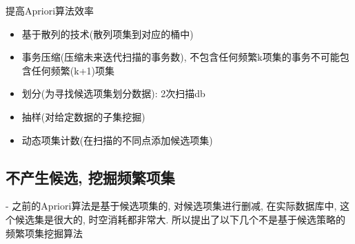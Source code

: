 \documentclass[a4paper,10pt,english]{article}
\begin{document}
提高Apriori算法效率
\begin{itemize}
\item {} 
基于散列的技术(散列项集到对应的桶中)
\item {} 
事务压缩(压缩未来迭代扫描的事务数), 不包含任何频繁k项集的事务不可能包含任何频繁(k+1)项集
\item {} 
划分(为寻找候选项集划分数据): 2次扫描db
\item {} 
抽样(对给定数据的子集挖掘)
\item {} 
动态项集计数(在扫描的不同点添加候选项集)
\end{itemize}

\subsection{不产生候选, 挖掘频繁项集}
\begin{description}
\item {-}
\small{
之前的Apriori算法是基于候选项集的, 对候选项集进行删减, 在实际数据库中, 这个候选集是很大的, 时空消耗都非常大. 所以提出了以下几个不是基于候选策略的频繁项集挖掘算法}
\end{description}
\end{document}
